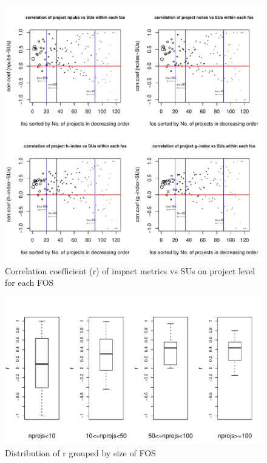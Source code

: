 \documentclass{tex/sig-alternate}
\begin{document}
\begin{figure}[!htb] 
  \centering 
    \includegraphics[width=1.0\columnwidth]{images/06_corr_metrics_vs_alloc_proj_by_fos.pdf} 
  \caption{Correlation coefficient (r) of impact metrics vs SUs on project level for each FOS}\label{F:corr-metrics-vs-alloc-proj-by-fos} 
\end{figure} 

\begin{figure}[!htb] 
  \centering 
    \includegraphics[width=1.0\columnwidth]{images/06_corr_ncites_boxplot_4groups.pdf} 
  \caption{Distribution of r grouped by size of FOS}\label{F:corr-ncites-box} 
\end{figure} 
 
\end{document}
